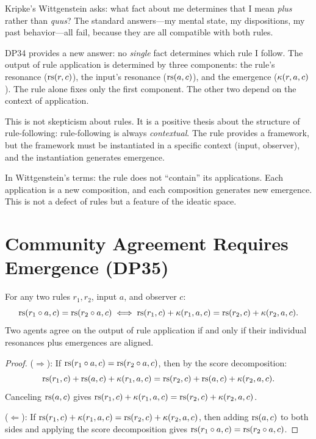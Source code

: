 \begin{interpretation}
\label{interp:rule-underdetermined}
Kripke's Wittgenstein asks: what fact about me determines that I mean
\emph{plus} rather than \emph{quus}?  The standard answers---my
mental state, my dispositions, my past behavior---all fail, because
they are all compatible with both rules.

DP34 provides a new answer: no \emph{single} fact determines which rule
I follow.  The output of rule application is determined by three
components: the rule's resonance ($\mathrm{rs}(r, c)$), the input's resonance
($\mathrm{rs}(a, c)$), and the emergence ($\kappa(r, a, c)$).  The rule alone
fixes only the first component.  The other two depend on the context
of application.

This is not skepticism about rules.  It is a positive thesis about
the structure of rule-following: rule-following is always
\emph{contextual}.  The rule provides a framework, but the framework
must be instantiated in a specific context (input, observer), and the
instantiation generates emergence.

In Wittgenstein's terms: the rule does not ``contain'' its applications.
Each application is a new composition, and each composition generates
new emergence.  This is not a defect of rules but a feature of
the ideatic space.
\end{interpretation}

\section{Community Agreement Requires Emergence (DP35)}

\begin{theorem}
\label{thm:community-requires-emergence}
For any two rules $r_1, r_2$, input $a$, and observer $c$:
\[
\mathrm{rs}(r_1 \circ a, c) = \mathrm{rs}(r_2 \circ a, c) \iff
\mathrm{rs}(r_1, c) + \kappa(r_1, a, c) = \mathrm{rs}(r_2, c) + \kappa(r_2, a, c).
\]
Two agents agree on the output of rule application if and only if
their individual resonances plus emergences are aligned.
\end{theorem}

\begin{proof}
($\Rightarrow$): If $\mathrm{rs}(r_1 \circ a, c) = \mathrm{rs}(r_2 \circ a, c)$,
then by the score decomposition:
\[
\mathrm{rs}(r_1, c) + \mathrm{rs}(a, c) + \kappa(r_1, a, c) =
\mathrm{rs}(r_2, c) + \mathrm{rs}(a, c) + \kappa(r_2, a, c).
\]
Canceling $\mathrm{rs}(a, c)$ gives
$\mathrm{rs}(r_1, c) + \kappa(r_1, a, c) = \mathrm{rs}(r_2, c) + \kappa(r_2, a, c)$.

($\Leftarrow$): If $\mathrm{rs}(r_1, c) + \kappa(r_1, a, c) = \mathrm{rs}(r_2, c) +
\kappa(r_2, a, c)$, then adding $\mathrm{rs}(a, c)$ to both sides and applying
the score decomposition gives
$\mathrm{rs}(r_1 \circ a, c) = \mathrm{rs}(r_2 \circ a, c)$.
\end{proof}

